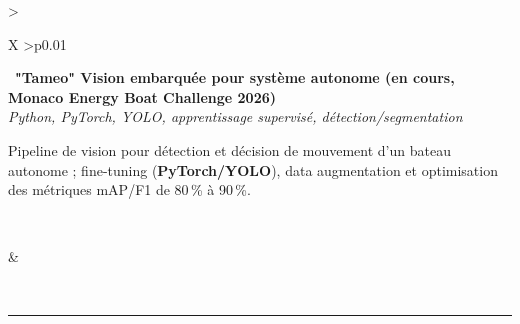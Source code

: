 \documentclass[letterpaper,10pt]{article}
\newcommand{\indentbox}[2][1em]{\hspace*{#1}\parbox{\dimexpr\linewidth-#1\relax}{#2}}
\begin{document}
\begin{tabularx}{\textwidth}{>{\raggedright\arraybackslash}X >{\raggedleft\arraybackslash}p{0.01\textwidth}}
    \begin{minipage}[t]{\linewidth}\raggedright
      \textbullet\ \textbf{"Tameo" \textendash{} Vision embarqu\'ee pour syst\`eme autonome (en cours, Monaco Energy Boat Challenge 2026)}\\
      \textit{\footnotesize Python, PyTorch, YOLO, apprentissage supervis\'e, d\'etection/segmentation}\\
      \indentbox{\footnotesize Pipeline de vision pour d\'etection et d\'ecision de mouvement d'un bateau autonome ; fine-tuning (\textbf{PyTorch/YOLO}), data augmentation et optimisation des m\'etriques mAP/F1 de 80\,\% \`a 90\,\%.}\\
    \end{minipage}
    &
    \begin{minipage}[t]{\linewidth}\raggedleft %
    \end{minipage}\\

  \end{tabularx}





\vspace{5pt}
\noindent\rule{\textwidth}{0.4pt}
\vspace{1pt}
\end{document}
